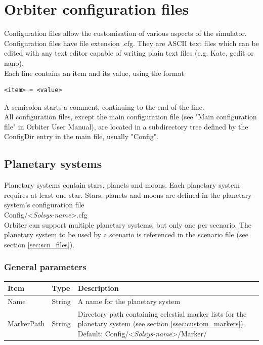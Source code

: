 \documentclass[Orbiter Developer Manual.tex]{subfiles}
\begin{document}
\section{Orbiter configuration files}
Configuration files allow the customisation of various aspects of the simulator. Configuration files have file extension .cfg. They are ASCII text files which can be edited with any text editor capable of writing plain text files (e.g. Kate, gedit or nano).\\
Each line contains an item and its value, using the format

\begin{lstlisting}[language=OSFS]
<item> = <value>
\end{lstlisting}

\noindent
A semicolon starts a comment, continuing to the end of the line.\\
All configuration files, except the main configuration file (see "Main configuration file" in Orbiter User Manual), are located in a subdirectory tree defined by the ConfigDir entry in the main file, usually "Config".

\subsection{Planetary systems}
\label{ssec:planetery_sys}
Planetary systems contain stars, planets and moons. Each planetary system requires at least one star. Stars, planets and moons are defined in the planetary system's configuration file\\
\indent Config/<\textit{Solsys-name}>.cfg\\
Orbiter can support multiple planetary systems, but only one per scenario. The planetary system to be used by a scenario is referenced in the scenario file (see section \ref{sec:scn_files}).

\subsubsection*{General parameters}

	\begin{longtable}{ |p{}|p{}|p{}| }
	\hline\rule{0pt}{2ex}
	\textbf{Item} & \textbf{Type} & \textbf{Description}\\
	\hline\rule{0pt}{2ex}
	Name & String & A name for the planetary system\\
	\hline\rule{0pt}{2ex}
	MarkerPath & String & Directory path containing celestial marker lists for the planetary system (see section \ref{ssec:custom_markers}). Default: Config/<\textit{Solsys-name}>/Marker/\\
	\hline
	\end{longtable}
\end{document}
